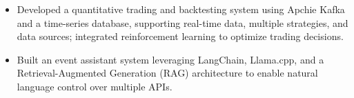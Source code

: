 

\begin{cventries}


  \cventrynotitle
  {
    \begin{cvitems} %
      \begin{itemize}
          \item {Developed a quantitative trading and backtesting system using Apchie Kafka and a time-series database, supporting real-time data, multiple strategies, and data sources; integrated reinforcement learning to optimize trading decisions.}
      \end{itemize}
      \begin{itemize}
          \item {Built an event assistant system leveraging LangChain, Llama.cpp, and a Retrieval-Augmented Generation (RAG) architecture to enable natural language control over multiple APIs.}
      \end{itemize}
    \end{cvitems}
  }

\end{cventries}
